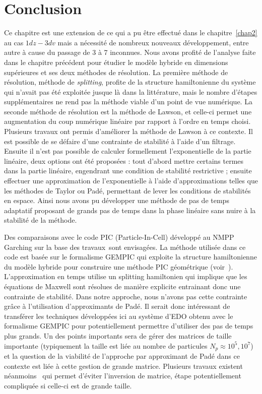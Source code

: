 
\section{Conclusion}

Ce chapitre est une extension de ce qui a pu être effectué dans le chapitre~\ref{chap2} au cas $1dz-3dv$ mais a nécessité de nombreux nouveaux développement, entre autre à cause du passage de 3 à 7 inconnues. Nous avons profité de l'analyse faite dans le chapitre précédent pour étudier le modèle hybride en dimensions supérieures et ses deux méthodes de résolution. La première méthode de résolution, méthode de \emph{splitting}, profite de la structure hamiltonienne du système qui n'avait pas été exploitée jusque là dans la littérature, mais le nombre d'étapes supplémentaires ne rend pas la méthode viable d'un point de vue numérique. La seconde méthode de résolution est la méthode de Lawson, et celle-ci permet une augmentation du coup numérique linéaire par rapport à l'ordre en temps choisi. Plusieurs travaux ont permis d'améliorer la méthode de Lawson à ce contexte. Il est possible de se défaire d'une contrainte de stabilité à l'aide d'un filtrage. Ensuite il n'est pas possible de calculer formellement l'exponentielle de la partie linéaire, deux options ont été proposées : tout d'abord mettre certains termes dans la partie linéaire, engendrant une condition de stabilité restrictive ; ensuite effectuer une approximation de l'exponentielle à l'aide d'approximations telles que les méthodes de Taylor ou Padé, permettant de lever les conditions de stabilités en espace. Ainsi nous avons pu développer une méthode de pas de temps adaptatif proposant de grands pas de temps dans la phase linéaire sans nuire à la stabilité de la méthode.

Des comparaisons avec le code PIC (Particle-In-Cell) développé au NMPP Garching sur la base des travaux~\cite{Holderied:2020}sont envisagées. La méthode utilisée dans ce code est basée sur le formalisme GEMPIC qui exploite la structure hamiltonienne du modèle hybride pour construire une méthode PIC géométrique (voir~\cite{Kraus:2017}). L’approximation en temps utilise un splitting hamiltonien qui implique que les équations de Maxwell sont résolues de manière explicite entrainant donc une contrainte de stabilité. Dans notre approche, nous n’avons pas cette contrainte grâce à l’utilisation d’approximants de Padé. Il serait donc intéressant de transférer les techniques développées ici au système d’EDO obtenu avec le formalisme GEMPIC pour potentiellement permettre d’utiliser des pas de temps plus grands. Un des points importants sera de gérer des matrices de taille importante (typiquement la taille est liée au nombre de particules $N_p\approx 10^5, 10^7$) et la question de la viabilité de l’approche par approximant de Padé dans ce contexte est liée à cette gestion de grande matrice. Plusieurs travaux existent néanmoins~\cite{Li:2011} qui permet d'éviter l'inversion de matrice, étape potentiellement compliquée si celle-ci est de grande taille.

